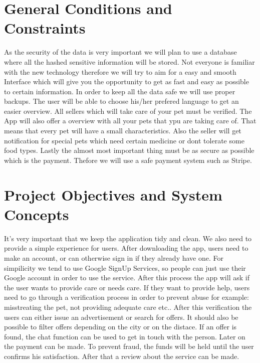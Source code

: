 \documentclass[12pt]{article}
\theoremstyle{definition}
\newenvironment{explanation}{%
}{}
\begin{document}
\section{General Conditions and Constraints}
As the security of the data is very important we will plan to use a database where all the hashed sensitive information will be stored.
\newline
Not everyone is familiar with the new technology therefore we will try to aim for a easy and smooth Interface which will give you the opportunity
to get as fast and easy as possible to certain information.
\newline
In order to keep all the data safe we will use proper backups. The user will be able to choose his/her prefered language to get an easier overview.
\newline
All sellers which will take care of your pet must be verified.
\newline
The App will also offer a overview with all your pets that ypu are taking care of. That means that every pet will have a small characteristics. 
Also the seller will get notification for special pets which need certain medicine or dont tolerate some food types. 
\newline
Lastly the almost most important thing must be as secure as possible which is the payment. Thefore we will use a safe payment system such as Stripe. 
\pagebreak

\section{Project Objectives and System Concepts}
\begin{explanation}
It's very important that we keep the application tidy and clean. We also need to provide a simple experience for users.
\newline
After downloading the app, users need to make an account, or can otherwise sign in if they already have one.
\newline
For simpilicity we tend to use Google SignUp Services, so people can just use their Google account in order to use the service.
\newline
After this process the app will ask if the user wants to provide care or needs care.
\newline
If they want to provide help, users need to go through a verification process in order to prevent abuse for example: misstreating the pet, not providing adequate care etc..
\newline
After this verification the users can either issue an advertisement or search for offers. It should also be possible to filter offers depending on the city or on the distace.
\newline
If an offer is found, the chat function can be used to get in touch with the person. Later on the payment can be made.
\newline
To prevent fraud, the funds will be held until the user confirms his satisfaction.
\newline
After that a review about the service can be made.

\end{explanation}
\end{document}
